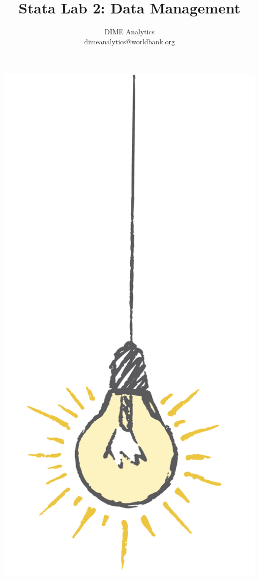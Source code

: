 \documentclass{tufte-handout}
\title{Stata Lab 2: Data Management}
\author{DIME Analytics \\ dimeanalytics@worldbank.org}
\begin{document}
\maketitle%

\begin{marginfigure}%
  \includegraphics[width=\linewidth]{light.png}
\end{marginfigure}
\end{document}
